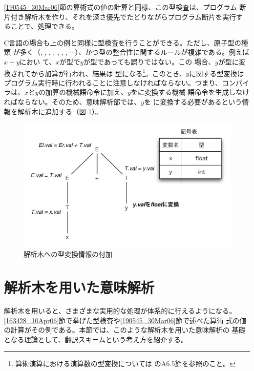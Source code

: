 \ref{190545_30Mar06}節の算術式の値の計算と同様、この型検査は、プログラム
断片付き解析木を作り、それを深さ優先でたどりながらプログラム断片を実行す
ることで、処理できる。

C言語の場合も上の例と同様に型検査を行うことができる。ただし、原子型の種類
が多く（, , ,
, , , ,
$\cdots$）、かつ型の整合性に関するルールが複雑である。例えば$x + y$におい
て、$x$が型で$y$が型であっても誤りではない。この
場合、$y$が型に変換されてから加算が行われ、結果は
型になる\footnote{算術演算における演算数の型変換については
\cite{カーニハン89}のA6.5節を参照のこと。}。このとき、$y$に関する型変換は
プログラム実行時に行われることに注意しなければならない。つまり、コンパイ
ラは、$x$と$y$の加算の機械語命令に加え、$y$をに変換する機械
語命令を生成しなければならない。そのため、意味解析部では、$y$を
に変換する必要があるという情報を解析木に追加する（図
\ref{191552_10Apr06}）。

\begin{figure}
 \begin{center}
  \includegraphics[width=12cm]{figure/type_conversion.pdf}
 \end{center}
 \caption{解析木への型変換情報の付加}
 \label{191552_10Apr06}
\end{figure}

\section{解析木を用いた意味解析}

解析木を用いると、さまざまな実用的な処理が体系的に行えるようになる。
\ref{163428_10Apr06}節で挙げた型検査や\ref{190545_30Mar06}節で述べた算術
式の値の計算がその例である。本節では、このような解析木を用いた意味解析の
基礎となる理論として、翻訳スキームという考え方を紹介する。

